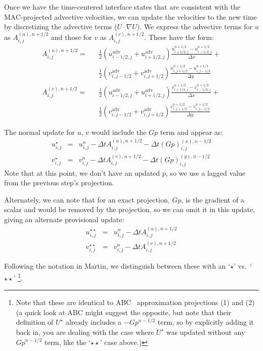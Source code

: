 Once we have the time-centered interface states that are consistent with
the MAC-projected advective velocities, we can update the velocities to
the new time by discretizing the advective terms ($U\cdot \nabla U$).
We express the advective terms for $u$ as $A^{(u),n+1/2}_{i,j}$ and
those for $v$ as $A^{(v),n+1/2}_{i,j}$.  These have the form:
\begin{eqnarray}
A^{(u),n+1/2}_{i,j} =   
   && \frac{1}{2}
     \left ( u^\mathrm{adv}_{i-1/2,j} + u^\mathrm{adv}_{i+1/2,j} \right )
     \frac{u^{n+1/2}_{i+1/2,j} - u^{n+1/2}_{i-1/2,j}}{\Delta x} + \nonumber \\
   && \frac{1}{2}
     \left ( v^\mathrm{adv}_{i,j-1/2} + v^\mathrm{adv}_{i,j+1/2} \right )
     \frac{u^{n+1/2}_{i,j+1/2} - u^{n+1/2}_{i,j-1/2}}{\Delta y} \\
%
A^{(v),n+1/2}_{i,j} = 
   && \frac{1}{2}
     \left ( u^\mathrm{adv}_{i-1/2,j} + u^\mathrm{adv}_{i+1/2,j} \right )
     \frac{v^{n+1/2}_{i+1/2,j} - v^{n+1/2}_{i-1/2,j}}{\Delta x} \nonumber +\\
   && \frac{1}{2}
     \left ( v^\mathrm{adv}_{i,j-1/2} + v^\mathrm{adv}_{i,j+1/2} \right )
     \frac{v^{n+1/2}_{i,j+1/2} - v^{n+1/2}_{i,j-1/2}}{\Delta y}
\end{eqnarray}

The normal update for $u$, $v$ would include the $Gp$ term and appear
as:
\begin{eqnarray}
u^{\star}_{i,j} &=& u^n_{i,j} - \Delta t A^{(u),n+1/2}_{i,j} - \Delta t (G p)^{(x),n-1/2}_{i,j} \\
v^{\star}_{i,j} &=& v^n_{i,j} - \Delta t A^{(v),n+1/2}_{i,j} - \Delta t (G p)^{(y),n-1/2}_{i,j} 
\end{eqnarray}
Note that at this point, we don't have an updated $p$, so we use a lagged
value from the previous step's projection.

Alternately, we can note that for an exact projection, $Gp$, is the gradient
of a scalar and would be removed by the projection, so we can omit it in
this update, giving an alternate provisional update:
\begin{eqnarray}
u^{\star\star}_{i,j} &=& u^n_{i,j} - \Delta t A^{(u),n+1/2}_{i,j}  \\
v^{\star\star}_{i,j} &=& v^n_{i,j} - \Delta t A^{(v),n+1/2}_{i,j}  
\end{eqnarray}


Following the notation in Martin, we distinguish between these with
an `$\star$' vs.\ `$\star\star$' \footnote{Note that these are identical to
ABC~\cite{ABC} approximation projections (1) and (2) (a quick look at ABC might
suggest the opposite, but note that their definition of $U^\star$
already includes a $-Gp^{n-1/2}$ term, so by explicitly adding it back
in, you are dealing with the case where $U^\star$ was updated without
any $Gp^{n-1/2}$ term, like the `$\star\star$' case above.)}.


